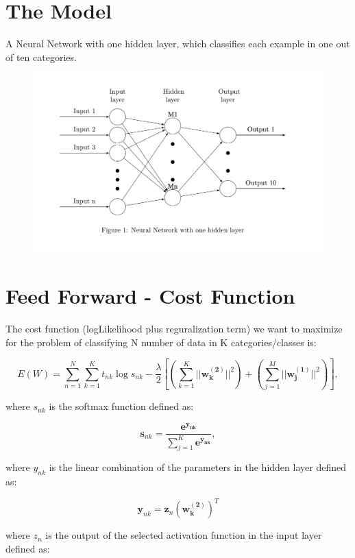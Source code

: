 \documentclass[11pt]{article}
\begin{document}
 \newpage
    \section{The Model}
A Neural Network with one hidden layer, which classifies each example in one out of ten categories.

\begin{figure}[H]
		\centering
		\includegraphics[width=1.10\textwidth]{../nn.png}
	\end{figure}
\newpage
\section{Feed Forward - Cost Function}

The cost function (logLikelihood plus reguralization term) we want to maximize for the problem of classifying N number of data in K categories/classes is:

$$
E(W) = \sum_{n=1}^N \sum_{k=1}^K t_{nk} \log s_{nk}   -  \frac{\lambda}{2} \left[ \left( \sum_{k=1}^K ||\mathbf{w_k^{(2)}}||^2 \right) + \left( \sum_{j=1}^M ||\mathbf{w_j^{(1)}}||^2 \right) \right], 
$$

\noindent where $s_{nk}$ is the softmax function defined as:

$$\mathbf s_{nk} = \frac{\mathbf{e^{y_{nk}}}}{\sum_{j=1}^K \mathbf{e^{y_{nk}}}},$$

\noindent where $ y_{nk}$ is the linear combination of the parameters in the hidden layer defined as:


 $$\mathbf y_{nk} = \mathbf{z}_n \mathbf{({w}_k^{(2)})}^T $$



\noindent where $z_{n}$ is the output of the selected activation function in the input layer defined as:
\end{document}
